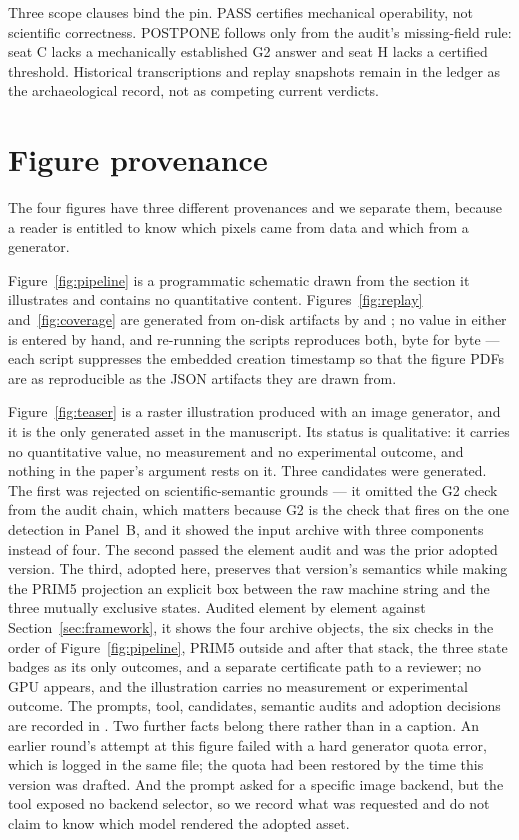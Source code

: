 \documentclass{article}
\begin{document}
Three scope clauses bind the pin. PASS certifies mechanical operability, not scientific
correctness. POSTPONE follows only from the audit's missing-field rule: seat C lacks a
mechanically established G2 answer and seat H lacks a certified threshold. Historical
transcriptions and replay snapshots remain in the ledger as the archaeological record,
not as competing current verdicts.

\section{Figure provenance}
\label{app:figures}

The four figures have three different provenances and we separate them, because a reader is
entitled to know which pixels came from data and which from a generator.

Figure~\ref{fig:pipeline} is a programmatic schematic drawn from the section it illustrates
and contains no quantitative content. Figures~\ref{fig:replay} and~\ref{fig:coverage} are
generated from on-disk artifacts by  and
; no value in either is entered by hand, and re-running the
scripts reproduces both, byte for byte --- each script suppresses the embedded creation
timestamp so that the figure PDFs are as reproducible as the JSON artifacts they are drawn
from.

Figure~\ref{fig:teaser} is a raster illustration produced with an image generator, and it is
the only generated asset in the manuscript. Its status is qualitative: it carries no quantitative value,
no measurement and no experimental outcome, and nothing in the paper's argument rests on it.
Three candidates were generated. The first was rejected on scientific-semantic grounds --- it
omitted the G2 check from the audit chain, which matters because G2 is the check that fires on
the one detection in Panel~B, and it showed the input archive with three components instead of
four. The second passed the element audit and was the prior adopted version. The third,
adopted here, preserves that version's semantics while making the PRIM5 projection an explicit
box between the raw machine string and the three mutually exclusive states. Audited element by
element against Section~\ref{sec:framework}, it shows the four archive objects, the six checks
in the order of Figure~\ref{fig:pipeline}, PRIM5 outside and after that stack, the three state
badges as its only outcomes, and a separate certificate path to a reviewer; no GPU appears,
and the illustration carries no measurement or experimental outcome. The prompts, tool,
candidates, semantic audits and adoption decisions are recorded in
. Two further facts belong there rather than in a caption. An
earlier round's attempt at this figure failed with a hard generator quota error, which is
logged in the same file; the quota had been restored by the time this version was drafted. And
the prompt asked for a specific image backend, but the tool exposed no backend
selector, so we record what was requested and do not claim to know which model rendered the
adopted asset.
\end{document}
